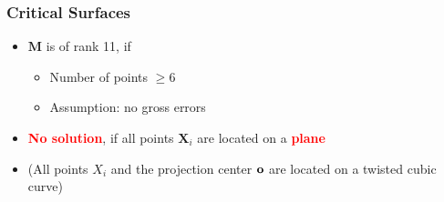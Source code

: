 \begin{frame}
  \frametitle{Critical Surfaces}
    \begin{itemize}
        \item $\mathbf{M}$ is of rank 11, if
        \begin{itemize}
            \item Number of points $\geq 6$
            \item Assumption: no gross errors
        \end{itemize}
        \item \textcolor{red}{\bfseries No solution}, if all points $\mathbf{X}_i$ are located on a \textcolor{red}{\bfseries plane}
        \item (All points $X_i$ and the projection center $\boldsymbol{\mathbf{o}}$ are located on a twisted cubic curve)
    \end{itemize}
\end{frame}

